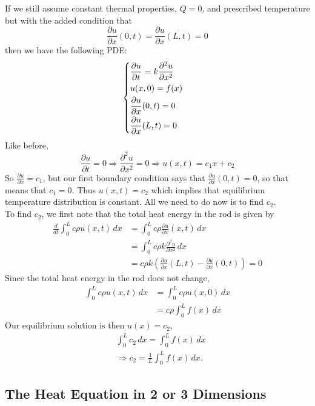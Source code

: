 \documentclass{article}
\begin{document}
	If we still assume constant thermal properties, $ Q = 0 $, and prescribed temperature but with the added condition that 
	\[
		\frac{\partial u}{\partial x}(0,t) = \frac{\partial u}{\partial x}(L,t) = 0
	\]
	then we have the following PDE:
	\[
		\begin{cases}
			\dfrac{\partial u}{\partial t} = k \dfrac{\partial^2 u}{\partial x^2} \vspace{1mm} \\
			u(x,0) = f(x) \vspace{1mm} \\
			\dfrac{\partial u}{\partial x}(0,t) = 0 \vspace{1mm} \\
			\dfrac{\partial u}{\partial x}(L,t) = 0
		\end{cases}
	\]
	Like before,
	\[
		\frac{\partial u}{\partial t} = 0 \Rightarrow \frac{\partial^2 u}{\partial x^2} = 0 \Rightarrow u(x,t) = c_1x + c_2
	\]
	So $ \frac{\partial u}{\partial x} = c_1 $, but our first boundary condition says that $ \frac{\partial u}{\partial x}(0,t) = 0 $, so that means that $ c_1=0 $. Thus $ u(x,t) = c_2 $ which implies that equilibrium temperature distribution is constant. All we need to do now is to find $ c_2 $. \\
	
	To find $ c_2 $, we first note that the total heat energy in the rod is given by
	\begin{align*}
		\frac{d}{dt} \int_0^L c\rho u(x,t) \, dx &= \int_0^L c\rho \frac{\partial u}{\partial x}(x,t) \, dx \\
		&= \int_0^L c \rho k \frac{\partial^2 u}{\partial x^2} \, dx \\
		&= c\rho k \left( \frac{\partial u}{\partial x}(L,t) - \frac{\partial u}{\partial x}(0,t) \right) = 0
	\end{align*}
	Since the total heat energy in the rod does not change,
	\begin{align*}
		\int_0^L c \rho u(x,t) \, dx &= \int_0^L c \rho u(x,0) \, dx \\
		&= c \rho \int_0^L f(x) \, dx
	\end{align*}
	Our equilibrium solution is then $ u(x) = c_2 $,
	\begin{align*}
		&\int_0^L c_2 \, dx = \int_0^L f(x) \, dx \\
		&\Rightarrow c_2 = \frac{1}{L} \int_0^L f(x) \, dx.
	\end{align*}
	
	
	\subsection{The Heat Equation in 2 or 3 Dimensions}
	
\end{document}

